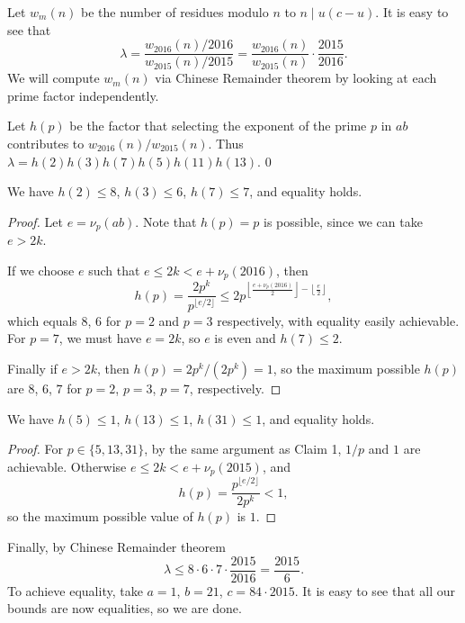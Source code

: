 Let $w_m(n)$ be the number of residues modulo $n$ to $n\mid u(c-u)$. It is easy to see that \[\lambda=\frac{w_{2016}(n)/2016}{w_{2015}(n)/2015}=\frac{w_{2016}(n)}{w_{2015}(n)}\cdot\frac{2015}{2016}.\]
We will compute $w_m(n)$ via Chinese Remainder theorem by looking at each prime factor independently.

Let $h(p)$ be the factor that selecting the exponent of the prime $p$ in $ab$ contributes to $w_{2016}(n)/w_{2015}(n)$. Thus $\lambda=h(2)h(3)h(7)h(5)h(11)h(13)$.
\setcounter{iclaim}0
\begin{iclaim}
    We have $h(2)\le8$, $h(3)\le6$, $h(7)\le7$, and equality holds.
\end{iclaim}
\begin{proof}
    Let $e=\nu_p(ab)$. Note that $h(p)=p$ is possible, since we can take $e>2k$.

    If we choose $e$ such that $e\le 2k<e+\nu_p(2016)$, then \[h(p)=\frac{2p^k}{p^{\lfloor e/2\rfloor}}\le2p^{\left\lfloor\tfrac{e+\nu_p(2016)}2\right\rfloor-\left\lfloor\tfrac e2\right\rfloor},\]
    which equals $8$, $6$ for $p=2$ and $p=3$ respectively, with equality easily achievable. For $p=7$, we must have $e=2k$, so $e$ is even and $h(7)\le2$.

    Finally if $e>2k$, then $h(p)=2p^k/(2p^k)=1$, so the maximum possible $h(p)$ are $8$, $6$, $7$ for $p=2$, $p=3$, $p=7$, respectively.
\end{proof}
\begin{iclaim}
    We have $h(5)\le1$, $h(13)\le1$, $h(31)\le1$, and equality holds.
\end{iclaim}
\begin{proof}
    For $p\in\{5,13,31\}$, by the same argument as Claim 1, $1/p$ and $1$ are achievable. Otherwise $e\le2k<e+\nu_p(2015)$, and \[h(p)=\frac{p^{\lfloor e/2\rfloor}}{2p^k}<1,\]
    so the maximum possible value of $h(p)$ is $1$.
\end{proof}

Finally, by Chinese Remainder theorem \[\lambda\le8\cdot6\cdot7\cdot\frac{2015}{2016}=\frac{2015}6.\]
To achieve equality, take $a=1$, $b=21$, $c=84\cdot2015$. It is easy to see that all our bounds are now equalities, so we are done.


